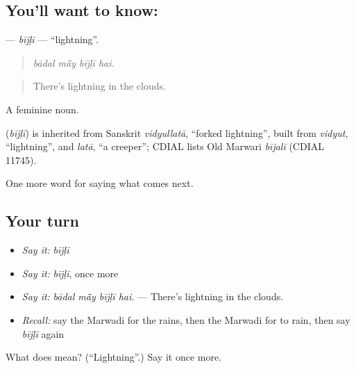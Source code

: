 \subsection*{You'll want to know: }
\textbf{} — \emph{bījḷī} — \textquotedblleft{}lightning\textquotedblright{}.

\begin{quote}
   
\end{quote}

\begin{quote}
\emph{bādal mā̃y bījḷī hai.}
\end{quote}

\begin{quote}
There's lightning in the clouds.
\end{quote}

A feminine noun.

\begin{cousinweb}
\textbf{} (\emph{bījḷī}) is inherited from Sanskrit \emph{vidyullatā}, \textquotedblleft{}forked lightning\textquotedblright{}, built from \emph{vidyut}, \textquotedblleft{}lightning\textquotedblright{}, and \emph{latā}, \textquotedblleft{}a creeper\textquotedblright{}; CDIAL lists Old Marwari \emph{bījalī} (CDIAL 11745).
\end{cousinweb}

\begin{grammarlens}[title={What you've built}]
One more word for saying what comes next.
\end{grammarlens}

\subsection*{Your turn}
\begin{itemize}
\raggedright
  \item \emph{Say it:} \emph{bījḷī}
  \item \emph{Say it:} \emph{bījḷī}, once more
  \item \emph{Say it:} \emph{bādal mā̃y bījḷī hai.} — There's lightning in the clouds.
  \item \emph{Recall:} say the Marwadi for the rains, then the Marwadi for to rain, then say \emph{bījḷī} again
\end{itemize}

\begin{tcolorbox}[breakable,colback=teal!4,colframe=teal!35!black,title={Before you move on}]
What does  mean? (\textquotedblleft{}Lightning\textquotedblright{}.) Say it once more.
\end{tcolorbox}
